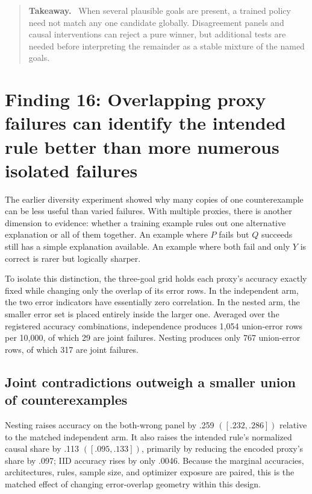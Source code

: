 \documentclass[11pt,a4paper]{article}
\newenvironment{takeaway}{%
  \begin{quote}\small\color{ink}\noindent\textbf{Takeaway.}\ 
}{%
  \end{quote}
}
\begin{document}
\begin{takeaway}
When several plausible goals are present, a trained policy need not match any one candidate globally. Disagreement panels and causal interventions can reject a pure winner, but additional tests are needed before interpreting the remainder as a stable mixture of the named goals.
\end{takeaway}

\section*{Finding 16: Overlapping proxy failures can identify the intended rule better than more numerous isolated failures}

The earlier diversity experiment showed why many copies of one counterexample can be less useful than varied failures. With multiple proxies, there is another dimension to evidence: whether a training example rules out one alternative explanation or all of them together. An example where $P$ fails but $Q$ succeeds still has a simple explanation available. An example where both fail and only $Y$ is correct is rarer but logically sharper.

To isolate this distinction, the three-goal grid holds each proxy's accuracy exactly fixed while changing only the overlap of its error rows. In the independent arm, the two error indicators have essentially zero correlation. In the nested arm, the smaller error set is placed entirely inside the larger one. Averaged over the registered accuracy combinations, independence produces 1,054 union-error rows per 10,000, of which 29 are joint failures. Nesting produces only 767 union-error rows, of which 317 are joint failures.

\subsection*{Joint contradictions outweigh a smaller union of counterexamples}

Nesting raises accuracy on the both-wrong panel by .259 $([.232,.286])$ relative to the matched independent arm. It also raises the intended rule's normalized causal share by .113 $([.095,.133])$, primarily by reducing the encoded proxy's share by .097; IID accuracy rises by only .0046. Because the marginal accuracies, architectures, rules, sample size, and optimizer exposure are paired, this is the matched effect of changing error-overlap geometry within this design.
\end{document}
